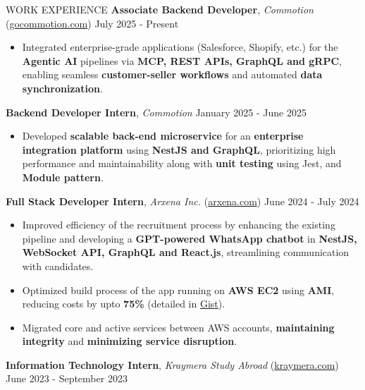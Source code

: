 \documentclass{resume} %
\begin{document}
\begin{rSection}{WORK EXPERIENCE}
\textbf{Associate Backend Developer}, \textit{Commotion} (\href{https://gocommotion.com}{gocommotion.com})  \hfill July 2025 - Present
\begin{itemize}
    \item Integrated enterprise-grade applications (Salesforce, Shopify, etc.) for the \textbf{Agentic AI} pipelines via \textbf{MCP, REST APIs, GraphQL and gRPC}, enabling seamless \textbf{customer-seller workflows} and automated \textbf{data synchronization}.
\end{itemize}
\textbf{Backend Developer Intern}, \textit{Commotion}  \hfill January 2025 - June 2025

    \begin{itemize}
        \itemsep -6pt {}
            \item Developed \textbf{scalable back-end microservice} for an \textbf{enterprise integration platform} using \textbf{NestJS and GraphQL}, prioritizing high performance and maintainability along with \textbf{unit testing} using Jest, and \textbf{Module pattern}.
            
    \end{itemize}

    \textbf{Full Stack Developer Intern}, \textit{Arxena Inc.} (\href{https://arxena.com}{arxena.com})  \hfill June 2024 - July 2024

    \begin{itemize}
        \itemsep -6pt {}
        \item Improved efficiency of the recruitment process by enhancing the existing
              pipeline and developing a \textbf{GPT-powered WhatsApp chatbot} in
              \textbf{NestJS, WebSocket API, GraphQL and React.js}, streamlining
              communication with candidates.
        \item  Optimized build process of the app running on \textbf{AWS EC2} using \textbf{AMI},
              reducing costs by upto \textbf{75\%} (detailed in \href{https://gist.github.com/ninadnaik10/7e9faf7f9d68035a5fe5a89a3a599c0d}{Gist}).
              \item Migrated core and active services between AWS accounts, \textbf{maintaining integrity} and \textbf{minimizing service disruption}.
    \end{itemize}

    \textbf{Information Technology Intern}, \textit{Kraymera Study Abroad} (\href{https://kraymera.com}{kraymera.com})  \hfill June 2023 - September 2023


\end{rSection}
\end{document}
